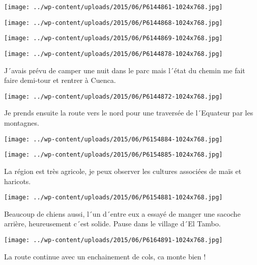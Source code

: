 \centerline{\texttt{[image: ../wp-content/uploads/2015/06/P6144861-1024x768.jpg]} } 
 \newline
 \newline
\centerline{\texttt{[image: ../wp-content/uploads/2015/06/P6144868-1024x768.jpg]} } 
 \newline
 \newline
\centerline{\texttt{[image: ../wp-content/uploads/2015/06/P6144869-1024x768.jpg]} } 
 \newline
 \newline
\centerline{\texttt{[image: ../wp-content/uploads/2015/06/P6144878-1024x768.jpg]} } 
 \newline
 J´avais prévu de camper une nuit dans le parc mais l´état du chemin me fait faire demi-tour et rentrer à Cuenca. \newline
 \newline
\centerline{\texttt{[image: ../wp-content/uploads/2015/06/P6144872-1024x768.jpg]} } 
 \newline
 Je prends ensuite la route vers le nord pour une traversée de l´Equateur par les montagnes. \newline
 \newline
\centerline{\texttt{[image: ../wp-content/uploads/2015/06/P6154884-1024x768.jpg]} } 
 \newline
 \newline
\centerline{\texttt{[image: ../wp-content/uploads/2015/06/P6154885-1024x768.jpg]} } 
 \newline
 La région est très agricole, je peux observer les cultures associées de maïs et haricots. \newline
 \newline
\centerline{\texttt{[image: ../wp-content/uploads/2015/06/P6154881-1024x768.jpg]} } 
 \newline
 Beaucoup de chiens aussi, l´un d´entre eux a essayé de manger une sacoche arrière, heureusement c´est solide. \newline
 Pause dans le village d´El Tambo. \newline
 \newline
\centerline{\texttt{[image: ../wp-content/uploads/2015/06/P6164891-1024x768.jpg]} } 
 \newline
 La route continue avec un enchainement de cols, ca monte bien ! \newline
 \newline
